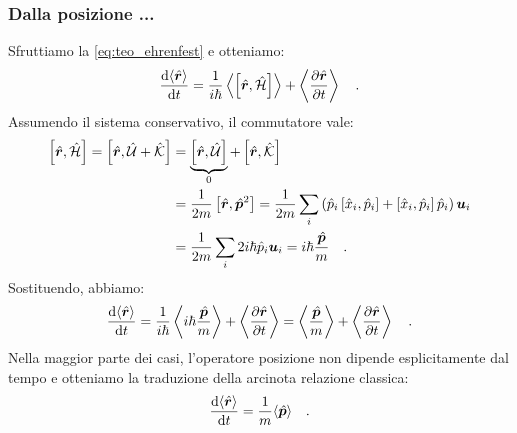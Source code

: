 \subsubsection{Dalla posizione ...}
Sfruttiamo la \eqref{eq:teo_ehrenfest} e otteniamo:
\[
    \dv{\langle \hat{\bm{r}} \rangle}{t} = \frac{1}{i\hbar}\left\langle \left[ \hat{\bm{r}},\hat{\mathcal{H}} \right] \right\rangle + \left\langle \pdv{\hat{\bm{r}}}{t}\right\rangle \quad.
\]
Assumendo il sistema conservativo, il commutatore vale:
\[
\begin{aligned}
    \left[ \hat{\bm{r}},\hat{\mathcal{H}} \right] = \left[ \hat{\bm{r}},\hat{\mathcal{U}} + \hat{\mathcal{K}} \right] &= \underbrace{\left[ \hat{\bm{r}},\hat{\mathcal{U}} \right]}_{0} + \left[ \hat{\bm{r}},\hat{\mathcal{K}} \right] \\
    &= \frac{1}{2m}\left[ \hat{\bm{r}},\hat{\bm{p}}^2 \right] = \frac{1}{2m}\sum_i \left(\hat{p}_i\left[ \hat{x}_i,\hat{p}_i \right] +\left[ \hat{x}_i,\hat{p}_i \right] \hat{p}_i\right)\bm{u}_i \\
    &= \frac{1}{2m}\sum_i 2i\hbar \hat{p}_i \bm{u}_i = i\hbar\frac{\hat{\bm{p}}}{m} \quad.
\end{aligned}
\]
Sostituendo, abbiamo:
\[
    \dv{\langle \hat{\bm{r}} \rangle}{t} = \frac{1}{i\hbar} \left\langle i\hbar\frac{\hat{\bm{p}}}{m}\right\rangle + \left\langle \pdv{\hat{\bm{r}}}{t}\right\rangle = \left\langle \frac{\hat{\bm{p}}}{m}\right\rangle + \left\langle \pdv{\hat{\bm{r}}}{t}\right\rangle \quad.
\]
Nella maggior parte dei casi, l'operatore posizione non dipende esplicitamente dal tempo e otteniamo la traduzione della arcinota relazione classica:
\begin{equation}
    \dv{\langle \hat{\bm{r}} \rangle}{t} = \frac{1}{m} \langle \hat{\bm{p}}\rangle \quad.
\end{equation}


